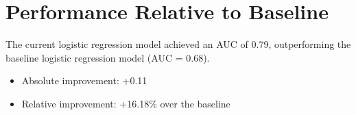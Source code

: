 \documentclass[
  letterpaper,
  DIV=11,
  numbers=noendperiod]{scrartcl}
\begin{document}
\section{Performance Relative to Baseline}

The current logistic regression model achieved an AUC of 0.79,
outperforming the baseline logistic regression model (AUC = 0.68).

\begin{itemize}
\item
  Absolute improvement: +0.11
\item
  Relative improvement: +16.18\% over the baseline
\end{itemize}
\end{document}
